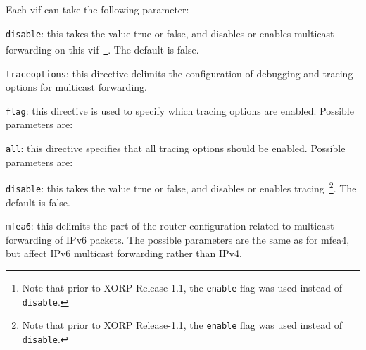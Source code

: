 \begin{description}
\begin{description}
  Each vif can take the following parameter:
\begin{description}
\item{\tt disable}: this takes the value {\stt true} or {\stt false},
  and disables or enables multicast forwarding on this vif~\footnote{Note
  that prior to XORP Release-1.1, the {\tt enable} flag was used instead of
  {\tt disable}.}.
  The default is {\stt false}.
\end{description}
\end{description}
\item{\tt traceoptions}: this directive delimits the configuration of
  debugging and tracing options for multicast forwarding.
\begin{description}
\item{\tt flag}: this directive is used to specify which tracing
  options are enabled.  Possible parameters are:
\begin{description}
\item{\tt all}: this directive specifies that all tracing
  options should be enabled.  Possible parameters are:
\begin{description}
\item{\tt disable}: this takes the value {\stt true} or {\stt false},
  and disables or enables tracing~\footnote{Note
  that prior to XORP Release-1.1, the {\tt enable} flag was used instead of
  {\tt disable}.}. The default is {\stt false}.
\end{description}
\end{description}
\end{description}
\item{\tt mfea6}: this delimits the part of the router configuration
  related to multicast forwarding of IPv6 packets.  The possible
  parameters are the same as for {\stt mfea4}, but affect IPv6
  multicast forwarding rather than IPv4.
\end{description}

\newpage

